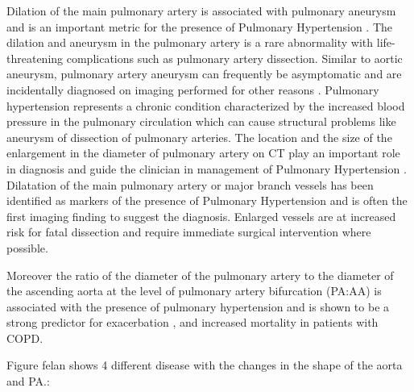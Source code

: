 Dilation of the main pulmonary artery is associated with pulmonary aneurysm \autocite{gupta2020pulmonary, park2018pulmonary} and is an important metric for the presence of Pulmonary Hypertension \autocite{raymond2014significance,truong2018four,aluja2018approach}. The dilation and aneurysm in the pulmonary artery is a rare abnormality with life-threatening complications such as pulmonary artery dissection. Similar to aortic aneurysm, pulmonary artery aneurysm can frequently be asymptomatic and are incidentally diagnosed on imaging performed for other reasons \autocite{gupta2020pulmonary}. 
Pulmonary hypertension represents a chronic condition characterized by the increased blood pressure in the pulmonary circulation which can cause structural problems like aneurysm of dissection of pulmonary arteries. The location and the size of the enlargement in the diameter of pulmonary artery on CT play an important role in diagnosis and guide the clinician in management of Pulmonary Hypertension \autocite{aluja2018approach}. Dilatation of the main pulmonary artery or major branch vessels has been identified as markers of the presence of Pulmonary Hypertension and is often the first imaging finding to suggest the diagnosis. Enlarged vessels are at increased risk for fatal dissection and require immediate surgical intervention where possible.

Moreover the ratio of the diameter of the pulmonary artery to the diameter of the ascending aorta at the level of pulmonary artery bifurcation (PA:AA) is associated with the presence of pulmonary hypertension \autocite{truong2018four} and is shown to be a strong predictor for exacerbation \autocite{wells2012pulmonary,rho2018ct} , and increased mortality \autocite{terzikhan2017pulmonary} in patients with \gls{COPD}.
 

Figure felan shows 4 different disease with the changes in the shape of the aorta and PA.:



